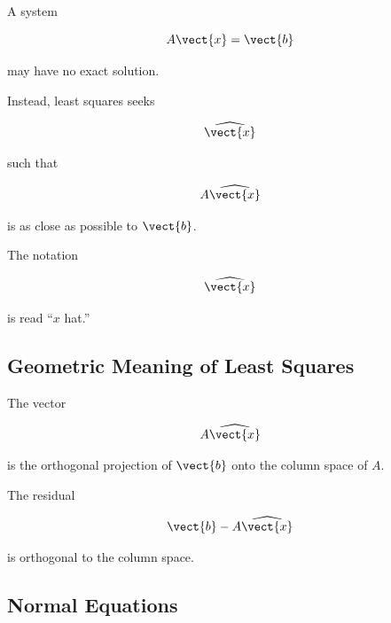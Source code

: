 A system

\[ A\vect{x}=\vect{b} \]

may have no exact solution.

Instead, least squares seeks

\[ \widehat{\vect{x}} \]

such that

\[ A\widehat{\vect{x}} \]

is as close as possible to \(\vect{b}\).

The notation

\[ \widehat{\vect{x}} \]

is read ``\(x\) hat.''

\subsection{Geometric Meaning of Least Squares}
\label{subsec:least-squares-geometry}

The vector

\[ A\widehat{\vect{x}} \]

is the orthogonal projection of \(\vect{b}\) onto the column space of \(A\).

\begin{center}
\end{center}

The residual

\[ \vect{b}-A\widehat{\vect{x}} \]

is orthogonal to the column space.

\subsection{Normal Equations}
\label{subsec:normal-equations}

